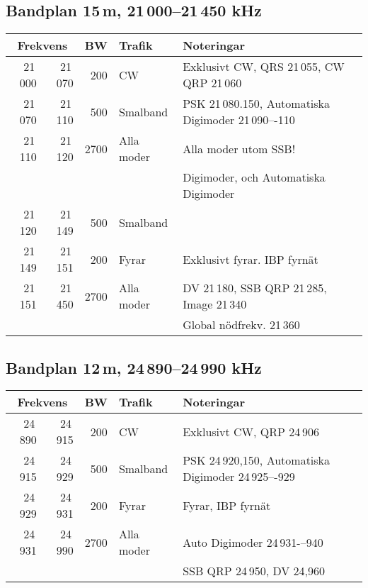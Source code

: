 \subsection{Bandplan 15\,m, 21\,000--21\,450 kHz}
\begin{tabular}{rrrll}
\multicolumn{2}{c}{\textbf{Frekvens}} & \textbf{BW} & \textbf{Trafik} & \textbf{Noteringar} \\ \hline

21\,000 & 21\,070 & 200  & CW         & Exklusivt CW, QRS 21\,055, CW QRP 21\,060           \\ \hline
21\,070 & 21\,110 & 500  & Smalband   & PSK 21\,080.150, Automatiska Digimoder 21\,090–-110 \\
21\,110 & 21\,120 & 2700 & Alla moder & Alla moder utom SSB!                                \\
        &         &      &            & Digimoder, och Automatiska Digimoder                \\ \hline
21\,120 & 21\,149 & 500  & Smalband   &                                                     \\ \hline
21\,149 & 21\,151 & 200  & Fyrar      & Exklusivt fyrar. IBP fyrnät                         \\ \hline
21\,151 & 21\,450 & 2700 & Alla moder & DV 21\,180, SSB QRP 21\,285, Image 21\,340          \\
        &         &      &            & Global nödfrekv. 21\,360                            \\ \hline
\end{tabular}

\subsection{Bandplan 12\,m, 24\,890--24\,990 kHz}
\begin{tabular}{rrrll}
\multicolumn{2}{c}{\textbf{Frekvens}} & \textbf{BW} & \textbf{Trafik} & \textbf{Noteringar} \\ \hline
24\,890 & 24\,915 & 200  & CW         & Exklusivt CW, QRP 24\,906                             \\ \hline
24\,915 & 24\,929 & 500  & Smalband   & PSK 24\,920,150, Automatiska Digimoder 24\,925–-929 \\ \hline
24\,929 & 24\,931 & 200  & Fyrar      & Fyrar, IBP fyrnät                                    \\ \hline
24\,931 & 24\,990 & 2700 & Alla moder & Auto Digimoder 24\,931-–940                        \\
       &        &      &            & SSB QRP 24\,950, DV 24,960                            \\ \hline
\end{tabular}

